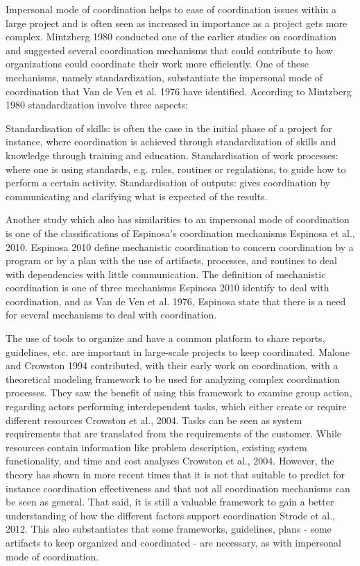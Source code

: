 Impersonal mode of coordination helps to ease of coordination issues within a large project and is often seen as increased in importance as a project gets more complex. Mintzberg 1980 conducted one of the earlier studies on coordination and suggested several coordination mechanisms that could contribute to how organizations could coordinate their work more efficiently. One of these mechanisms, namely standardization, substantiate the impersonal mode of coordination that Van de Ven et al. 1976 have identified. According to Mintzberg 1980 standardization involve three aspects:

Standardisation of skills: is often the case in the initial phase of a project for instance, where coordination is achieved through standardization of skills and knowledge through training and education.
Standardisation of work processes: where one is using standards, e.g. rules, routines or regulations, to guide how to perform a certain activity.
Standardisation of outputs: gives coordination by communicating and clarifying what is expected of the results.

Another study which also has similarities to an impersonal mode of coordination is one of the classifications of Espinosa’s coordination mechanisms Espinosa et al., 2010. Espinosa 2010 define mechanistic coordination to concern coordination by a program or by a plan with the use of artifacts, processes, and routines to deal with dependencies with little communication. The definition of mechanistic coordination is one of three mechanisms Espinosa 2010 identify to deal with coordination, and as Van de Ven et al. 1976, Espinosa state that there is a need for several mechanisms to deal with coordination.

The use of tools to organize and have a common platform to share reports, guidelines, etc. are important in large-scale projects to keep coordinated. Malone and Crowston 1994 contributed, with their early work on coordination, with a theoretical modeling framework to be used for analyzing complex coordination processes. They saw the benefit of using this framework to examine group action, regarding actors performing interdependent tasks, which either create or require different resources Crowston et al., 2004. Tasks can be seen as system requirements that are translated from the requirements of the customer. While resources contain information like problem description, existing system functionality, and time and cost analyses Crowston et al., 2004. However, the theory has shown in more recent times that it is not that suitable to predict for instance coordination effectiveness and that not all coordination mechanisms can be seen as general. That said, it is still a valuable framework to gain a better understanding of how the different factors support coordination Strode et al., 2012. This also substantiates that some frameworks, guidelines, plans - some artifacts to keep organized and coordinated - are necessary, as with impersonal mode of coordination.

